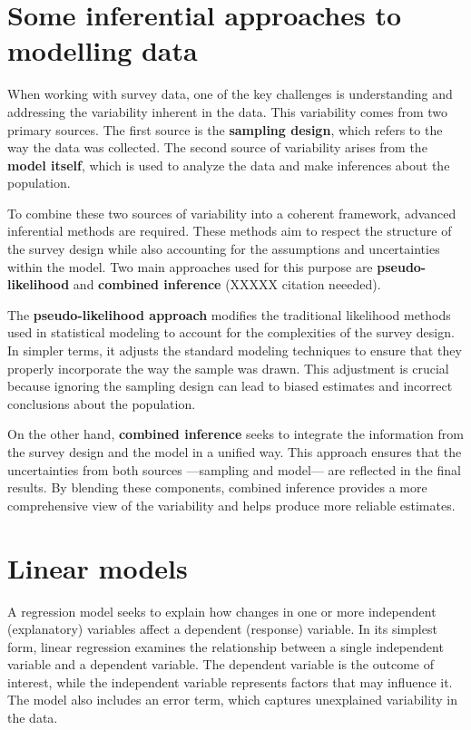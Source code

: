 \documentclass[
  12pt,
]{book}
\begin{document}
\hypertarget{some-inferential-approaches-to-modelling-data}{%
\section{Some inferential approaches to modelling data}\label{some-inferential-approaches-to-modelling-data}}

When working with survey data, one of the key challenges is understanding and addressing the variability inherent in the data. This variability comes from two primary sources. The first source is the \textbf{sampling design}, which refers to the way the data was collected. The second source of variability arises from the \textbf{model itself}, which is used to analyze the data and make inferences about the population.

To combine these two sources of variability into a coherent framework, advanced inferential methods are required. These methods aim to respect the structure of the survey design while also accounting for the assumptions and uncertainties within the model. Two main approaches used for this purpose are \textbf{pseudo-likelihood} and \textbf{combined inference} (XXXXX citation neeeded).

The \textbf{pseudo-likelihood approach} modifies the traditional likelihood methods used in statistical modeling to account for the complexities of the survey design. In simpler terms, it adjusts the standard modeling techniques to ensure that they properly incorporate the way the sample was drawn. This adjustment is crucial because ignoring the sampling design can lead to biased estimates and incorrect conclusions about the population.

On the other hand, \textbf{combined inference} seeks to integrate the information from the survey design and the model in a unified way. This approach ensures that the uncertainties from both sources ---sampling and model--- are reflected in the final results. By blending these components, combined inference provides a more comprehensive view of the variability and helps produce more reliable estimates.

\hypertarget{linear-models}{%
\section{Linear models}\label{linear-models}}

A regression model seeks to explain how changes in one or more independent (explanatory) variables affect a dependent (response) variable. In its simplest form, linear regression examines the relationship between a single independent variable and a dependent variable. The dependent variable is the outcome of interest, while the independent variable represents factors that may influence it. The model also includes an error term, which captures unexplained variability in the data.
\end{document}
